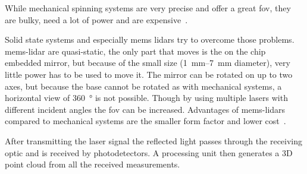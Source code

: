 While mechanical spinning systems are very precise and offer a great \gls{fov}, they are bulky, need a lot of power and are expensive~\cite{Fujii2005}.\par
Solid state systems and especially \gls{mems} \glspl{lidar} try to overcome those problems.
\gls{mems}-\gls{lidar} are quasi-static, the only part that moves is the on the chip embedded mirror, but because of the small size (\SIrange{1}{7}{\milli\metre} diameter), very little power has to be used to move it.
The mirror can be rotated on up to two axes, but because the base cannot be rotated as with mechanical systems, a horizontal view of \SI{360}{\degree} is not possible.
Though by using multiple lasers with different incident angles the \gls{fov} can be increased.
Advantages of \gls{mems}-\glspl{lidar} compared to mechanical systems are the smaller form factor and lower cost~\cite{Wang2020}.\par
After transmitting the laser signal the reflected light passes through the receiving optic and is received by photodetectors.
A processing unit then generates a 3D point cloud from all the received measurements.


